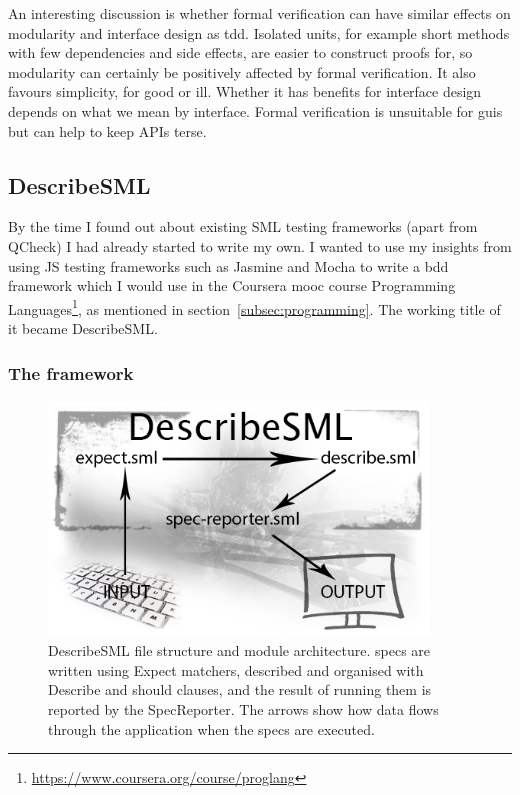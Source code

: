 \documentclass[11pt]{article}
\begin{document}
An interesting discussion is whether formal verification can have similar effects on modularity and interface design as \gls{tdd}. Isolated units, for example short methods with few dependencies and side effects, are easier to construct proofs for, so modularity can certainly be positively affected by formal verification. It also favours simplicity, for good or ill. Whether it has benefits for interface design depends on what we mean by interface. Formal verification is unsuitable for \glspl{gui} but can help to keep APIs terse.


\subsection{DescribeSML}
\label{subsec:describesml}

By the time I found out about existing SML testing frameworks (apart from QCheck) I had already started to write my own. I wanted to use my insights from using JS testing frameworks such as Jasmine and Mocha to write a \gls{bdd} framework which I would use in the Coursera \gls{mooc} course Programming Languages\footnote{\url{https://www.coursera.org/course/proglang}}, as mentioned in section~\ref{subsec:programming}. The working title of it became DescribeSML.

\subsubsection{The framework}

\begin{figure}[ht!]
\centering
\includegraphics[width=0.9\textwidth]{pics/DescribeSML.png}
\caption{DescribeSML file structure and module architecture. \Glspl{spec} are written using Expect \glspl{matcher}, described and organised with Describe and should clauses, and the result of running them is reported by the SpecReporter. The arrows show how data flows through the application when the \glspl{spec} are executed.}
\label{fig:describesml}
\end{figure}
\end{document}
